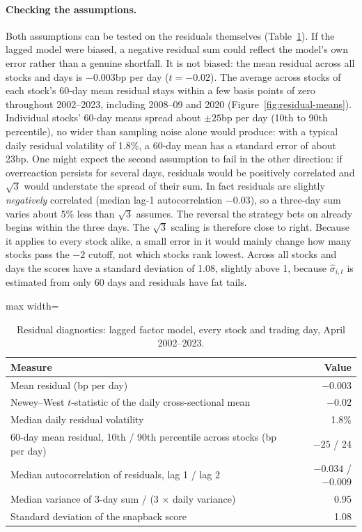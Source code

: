 \documentclass[12pt,letterpaper]{article}
\begin{document}
\paragraph{Checking the assumptions.} Both assumptions can be tested on the residuals themselves (Table~\ref{tab:residuals}). If the lagged model were biased, a negative residual sum could reflect the model's own error rather than a genuine shortfall. It is not biased: the mean residual across all stocks and days is $-0.003$bp per day ($t = -0.02$). The average across stocks of each stock's 60-day mean residual stays within a few basis points of zero throughout 2002--2023, including 2008--09 and 2020 (Figure~\ref{fig:residual-means}). Individual stocks' 60-day means spread about $\pm 25$bp per day (10th to 90th percentile), no wider than sampling noise alone would produce: with a typical daily residual volatility of 1.8\%, a 60-day mean has a standard error of about 23bp. One might expect the second assumption to fail in the other direction: if overreaction persists for several days, residuals would be positively correlated and $\sqrt{3}$ would understate the spread of their sum. In fact residuals are slightly \emph{negatively} correlated (median lag-1 autocorrelation $-0.03$), so a three-day sum varies about 5\% less than $\sqrt{3}$ assumes. The reversal the strategy bets on already begins within the three days. The $\sqrt{3}$ scaling is therefore close to right. Because it applies to every stock alike, a small error in it would mainly change how many stocks pass the $-2$ cutoff, not which stocks rank lowest. Across all stocks and days the scores have a standard deviation of 1.08, slightly above 1, because $\hat\sigma_{i,t}$ is estimated from only 60 days and residuals have fat tails.

\begin{table}[!htbp]
\centering
\caption{Residual diagnostics: lagged factor model, every stock and trading day, April 2002--2023.}
\label{tab:residuals}
\begin{adjustbox}{max width=\linewidth}
\begin{tabular}{lr}
\toprule
Measure & Value \\
\midrule
Mean residual (bp per day) & $-0.003$ \\
Newey--West $t$-statistic of the daily cross-sectional mean & $-0.02$ \\
Median daily residual volatility & 1.8\% \\
60-day mean residual, 10th / 90th percentile across stocks (bp per day) & $-25$ / 24 \\
Median autocorrelation of residuals, lag 1 / lag 2 & $-0.034$ / $-0.009$ \\
Median variance of 3-day sum / (3 $\times$ daily variance) & 0.95 \\
Standard deviation of the snapback score & 1.08 \\
\bottomrule
\end{tabular}
\end{adjustbox}
\end{table}
\end{document}
